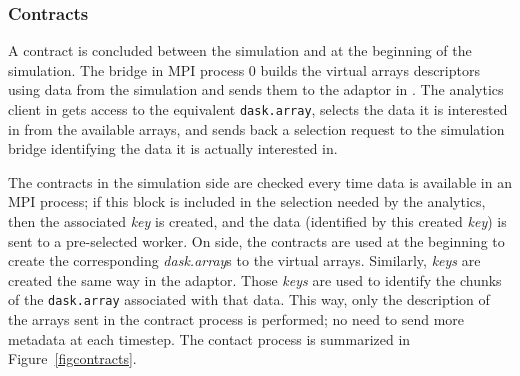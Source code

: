 \subsubsection{Contracts}\label{sec:contracts}

A contract is concluded between the simulation and \dask at the beginning of the simulation. The bridge in MPI process $0$ builds the \deisa virtual arrays descriptors using data from the simulation and sends them to the adaptor in \dask. The analytics client in \dask gets access to the equivalent \texttt{dask.array}, selects the data it is interested in from the available arrays, and sends back a selection request to the simulation bridge identifying the data it is actually interested in.

The contracts in the simulation side are checked every time data is available in an MPI process; if this block is included in the selection needed by the analytics, then the associated \textit{key} is created, and the data (identified by this created \textit{key}) is sent to a pre-selected worker. On  \dask side, the contracts are used at the beginning to create the corresponding \textit{dask.array}s to the \deisa virtual arrays. Similarly, \textit{keys} are created the same way in the adaptor. Those \textit{keys} are used to identify the chunks of the \texttt{dask.array} associated with that data. This way, only the description of the arrays sent in the contract process is performed; no need to send more metadata at each timestep. The contact process is summarized in Figure~\ref{figcontracts}.

